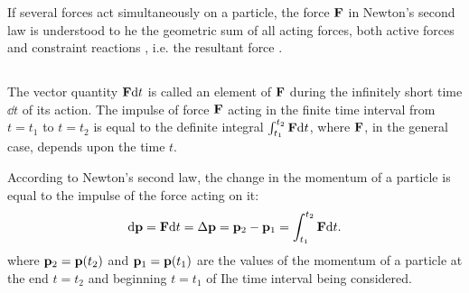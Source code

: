 If several forces act simultaneously on a particle, the force $\vb{F}$ in Newton's second law is understood to he the geometric sum of all acting forces, both active forces and constraint reactions , i.e. the resultant force .

\subsection{}\label{2.4.2} The vector quantity $\vb{F} \dd t$  is called an element of  $\vb{F}$ during the infinitely short time $\dd t$ of its action. The impulse of force $\vb{F}$ acting in the finite time interval from $t = t_{1}$ to $t = t_{2}$ is equal to the definite integral $\int_{t_{1}}^{t_{2}} \vb{F} \dd t$, where $\vb{F}$, in
the general case, depends upon the time $t$.

According to Newton's second law, the change in the momentum of a particle is equal to the impulse of the force acting on it:
\begin{equation*}%
\dd \vb{p} =  \vb{F} \dd t = \Delta \vb{p} = \vb{p}_{2} - \vb{p}_{1}  =\int_{t_{1}}^{t_{2}} \vb{F} \dd t.
\end{equation*}
where $\vb{p}_{2}= \vb{p} (t_{2})$ and $\vb{p}_{1}= \vb{p} (t_{1})$ are the values of the momen­tum of a particle at the end  $t = t_{2}$ and beginning $t = t_{1}$ of Ihe time interval being considered.


